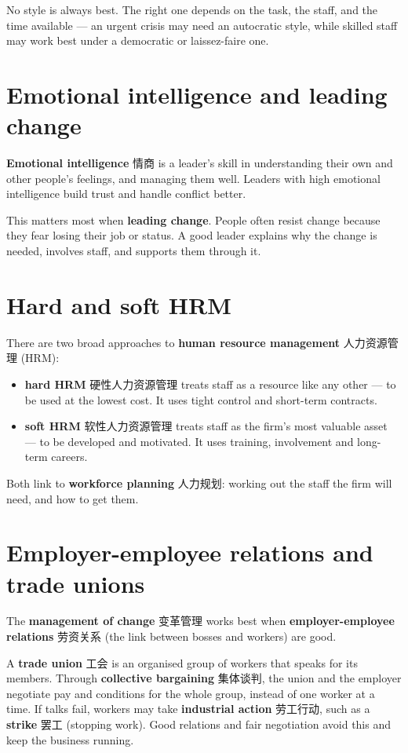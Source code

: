 \documentclass[11pt]{article}
\begin{document}
No style is always best. The right one depends on the task, the staff, and the time available — an urgent crisis may need an autocratic style, while skilled staff may work best under a democratic or laissez-faire one.

\section*{Emotional intelligence and leading change}

\textbf{Emotional intelligence} 情商 is a leader's skill in understanding their own and other people's feelings, and managing them well. Leaders with high emotional intelligence build trust and handle conflict better.

This matters most when \textbf{leading change}. People often resist change because they fear losing their job or status. A good leader explains why the change is needed, involves staff, and supports them through it.

\section*{Hard and soft HRM}

There are two broad approaches to \textbf{human resource management} 人力资源管理 (HRM):

\begin{itemize}
\item \textbf{hard HRM} 硬性人力资源管理 treats staff as a resource like any other — to be used at the lowest cost. It uses tight control and short-term contracts.

\item \textbf{soft HRM} 软性人力资源管理 treats staff as the firm's most valuable asset — to be developed and motivated. It uses training, involvement and long-term careers.

\end{itemize}

Both link to \textbf{workforce planning} 人力规划: working out the staff the firm will need, and how to get them.

\section*{Employer-employee relations and trade unions}

The \textbf{management of change} 变革管理 works best when \textbf{employer-employee relations} 劳资关系 (the link between bosses and workers) are good.

A \textbf{trade union} 工会 is an organised group of workers that speaks for its members. Through \textbf{collective bargaining} 集体谈判, the union and the employer negotiate pay and conditions for the whole group, instead of one worker at a time. If talks fail, workers may take \textbf{industrial action} 劳工行动, such as a \textbf{strike} 罢工 (stopping work). Good relations and fair negotiation avoid this and keep the business running.
\end{document}
